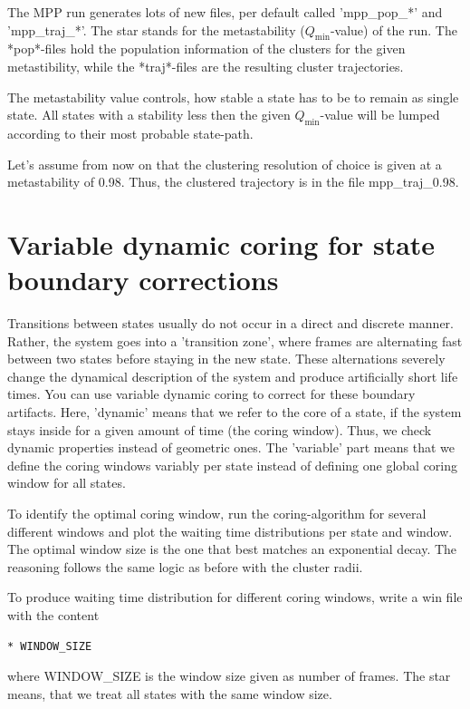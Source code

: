 \documentclass[12pt,a4paper,twoside,english,fleqn]{article}
\begin{document}
The MPP run generates lots of new files, per default called 'mpp\_pop\_*' and
'mpp\_traj\_*'. The star stands for the metastability ($Q_\text{min}$-value)
of the run. The *pop*-files hold the population information of the clusters
for the given metastibility, while the *traj*-files are the resulting cluster
trajectories.

The metastability value controls, how stable a state has to be to remain as
single state. All states with a stability less then the given
$Q_\text{min}$-value will be lumped according to their most probable state-path.

Let's assume from now on that the clustering resolution of choice is given at
a metastability of 0.98. Thus, the clustered trajectory is in the file
mpp\_traj\_0.98.


\section{Variable dynamic coring for state boundary corrections}
Transitions between states usually do not occur in a direct and discrete manner.
Rather, the system goes into a 'transition zone', where frames are alternating
fast between two states before staying in the new state.
These alternations severely change the dynamical description of the system and
produce artificially short life times.
You can use variable dynamic coring to correct for these boundary artifacts.
Here, 'dynamic' means that we refer to the core of a state, if the system stays
inside for a given amount of time (the coring window). Thus, we check dynamic
properties instead of geometric ones. The 'variable' part means that we define
the coring windows variably per state instead of defining one global coring
window for all states.

To identify the optimal coring window, run the coring-algorithm for several
different windows and plot the waiting time distributions per state and window.
The optimal window size is the one that best matches an exponential decay.
The reasoning follows the same logic as before with the cluster radii.

To produce waiting time distribution for different coring windows, write a
{\ttfamily win} file with the content
\begin{lstlisting}[language=bash,basicstyle=\ttfamily]
  * WINDOW_SIZE
\end{lstlisting}
where {\ttfamily WINDOW\_SIZE} is the window size given as number of frames.
The star means, that we treat all states with the same window size.
\end{document}
